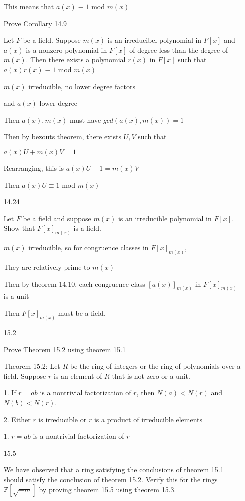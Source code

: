 \documentclass[12pt]{article}
\begin{document}
\begin{itemize}
	This means that $a(x) \equiv 1$ mod $m(x)$

	Prove Corollary 14.9

	Let $F$ be a field. Suppose $m(x)$ is an irreducibel polynomial in $F[x]$ and $a(x)$ is a nonzero polynomial in $F[x]$ of degree less than the degree of $m(x)$. Then there exists a polynomial $r(x)$ in $F[x]$ such that $a(x)r(x) \equiv 1$ mod $m(x)$

	$m(x)$ irreducible, no lower degree factors

	and $a(x)$ lower degree

	Then $a(x), m(x)$ must have $gcd(a(x),m(x)) = 1$

	Then by bezouts theorem, there exists $U,V$ such that

	$a(x)U + m(x)V = 1$

	Rearranging, this is $a(x)U - 1 = m(x)V$

	Then $a(x)U \equiv 1$ mod $m(x)$


\newpage 
\item[14.24]

	Let $F$ be a field and suppose $m(x)$ is an irreducible polynomial in $F[x]$. Show that $F[x]_{m(x)}$ is a field.

	$m(x)$ irreducible, so for congruence classes in $F[x]_{m(x)}$,

	They are relatively prime to $m(x)$

	Then by theorem 14.10, each congruence class $[a(x)]_{m(x)}$ in $F[x]_{m(x)}$ is a unit

	Then $F[x]_{m(x)}$ must be a field.

\newpage 
\item[15.2]

	Prove Theorem 15.2 using theorem 15.1

	Theorem 15.2:	Let $R$ be the ring of integers or the ring of polynomials over a field. Suppose $r$ is an element of $R$ that is not zero or a unit.

	1. If $r = ab$ is a nontrivial factorization of $r$, then $N(a) < N(r)$ and $N(b) < N(r)$.

	2. Either $r$ is irreducible or $r$ is a product of irreducible elements

	1. $r = ab$ is a nontrivial factorization of $r$



\newpage 
\item[15.5]

	We have observed that a ring satisfying the conclusions of theorem 15.1 should satisfy the conclusion of theorem 15.2. Verify this for the rings $\mathbb{Z}[\sqrt{-m}]$ by proving theorem 15.5 using theorem 15.3.


\end{itemize}
\end{document}
